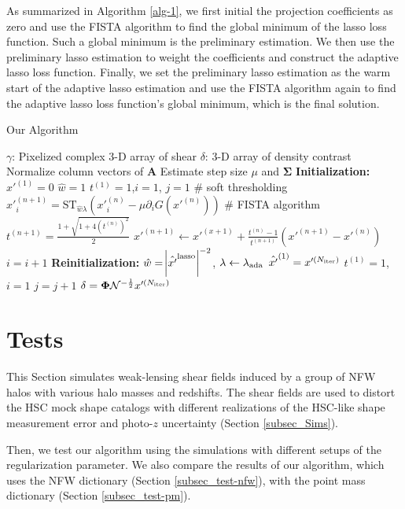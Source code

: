 \documentclass[twocolumn]{aastex62}
\begin{document}
As summarized in Algorithm \ref{alg-1}, we first initial the projection
coefficients as zero and use the FISTA algorithm to find the global minimum of
the lasso loss function. Such a global minimum is the preliminary estimation.
We then use the preliminary lasso estimation to weight the coefficients and
construct the adaptive lasso loss function. Finally, we set the preliminary
lasso estimation as the warm start of the adaptive lasso estimation and use the
FISTA algorithm again to find the adaptive lasso loss function's global minimum,
which is the final solution.


\begin{algorithm}[H]
\renewcommand{\thealgorithm}{}
\label{alg-1}
\caption{Our Algorithm}
\begin{algorithmic}[1]
\INPUT $\gamma$: Pixelized complex $3$-D array of shear
\OUTPUT  $\delta$: $3$-D array of density contrast
\STATE Normalize column vectors of $\mathbf{A}$
\STATE Estimate step size $\mu$ and $\mathbf{\Sigma}$
\STATE \textbf{Initialization:}
\STATE $x'^{(1)} = 0$
\STATE $\hat{w}=1$
\STATE $t^{(1)}=1$,$i=1$, $j=1$
        \STATE \# soft thresholding
        \STATE $x'^{(n+1)}_{i}=\mathrm{ST}_{\hat{w}\lambda} \left(x'^{(n)}_{i} -\mu \partial_i G(x'^{(n)})\right)$
        \STATE \# FISTA algorithm
        \STATE $t^{(n+1)}=\frac{1+\sqrt{1+4(t^{(n)})^2}}{2}$
        \STATE $x'^{(n+1)} \leftarrow x'^{(x+1)}+ \frac{t^{(n)}-1}{t^{(n+1)}}(x'^{(n+1)}-x'^{(n)})$
        \STATE $i=i+1$
    \ENDWHILE
\STATE \textbf{Reinitialization:}
\STATE $\hat{w}=\abs{\hat{x'}^{\rm{lasso}}}^{-2}$, $\lambda \leftarrow
\lambda_{\rm{ada}}$
\STATE $\hat{x'}^{(1)} = x'^{(N_{\rm{iter}})}$
\STATE $t^{(1)}=1$, $i=1$
\STATE $j=j+1$
\ENDWHILE
\STATE $\delta=\mathbf{\Phi}\mathcal{N}^{-\frac{1}{2}}x'^{(N_{\rm{iter}})}$
\end{algorithmic}
\end{algorithm}


\section{Tests}
\label{sec_Test}

This Section simulates weak-lensing shear fields induced by a group of NFW
halos with various halo masses and redshifts. The shear fields are used to
distort the HSC mock shape catalogs with different realizations of the HSC-like
shape measurement error and photo-$z$ uncertainty (Section \ref{subsec_Sims}).

Then, we test our algorithm using the simulations with different setups of the
regularization parameter. We also compare the results of our algorithm, which
uses the NFW dictionary (Section \ref{subsec_test-nfw}), with the point mass
dictionary (Section \ref{subsec_test-pm}).
\end{document}
